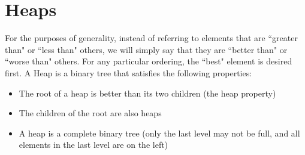 \chapter{Heaps}

For the purposes of generality, instead of referring to 
elements that are ``greater than" or ``less than" others,
we will simply say that they are ``better than" or ``worse than"
others. For any particular ordering, the ``best" element is desired first.
A Heap is a binary tree that satisfies the following properties:

\begin{itemize}
\item The root of a heap is better than its two children (the heap property)
\item The children of the root are also heaps  
\item A heap is a complete binary tree (only the last level may not be full, 
and all elements in the last level are on the left)
\end{itemize}

